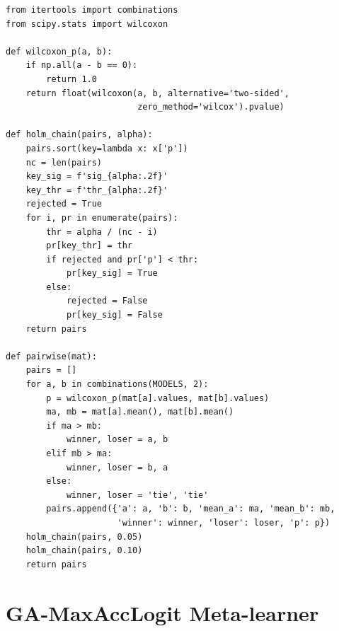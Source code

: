 \begin{lstlisting}
from itertools import combinations
from scipy.stats import wilcoxon

def wilcoxon_p(a, b):
    if np.all(a - b == 0):
        return 1.0
    return float(wilcoxon(a, b, alternative='two-sided',
                          zero_method='wilcox').pvalue)

def holm_chain(pairs, alpha):
    pairs.sort(key=lambda x: x['p'])
    nc = len(pairs)
    key_sig = f'sig_{alpha:.2f}'
    key_thr = f'thr_{alpha:.2f}'
    rejected = True
    for i, pr in enumerate(pairs):
        thr = alpha / (nc - i)
        pr[key_thr] = thr
        if rejected and pr['p'] < thr:
            pr[key_sig] = True
        else:
            rejected = False
            pr[key_sig] = False
    return pairs

def pairwise(mat):
    pairs = []
    for a, b in combinations(MODELS, 2):
        p = wilcoxon_p(mat[a].values, mat[b].values)
        ma, mb = mat[a].mean(), mat[b].mean()
        if ma > mb:
            winner, loser = a, b
        elif mb > ma:
            winner, loser = b, a
        else:
            winner, loser = 'tie', 'tie'
        pairs.append({'a': a, 'b': b, 'mean_a': ma, 'mean_b': mb,
                      'winner': winner, 'loser': loser, 'p': p})
    holm_chain(pairs, 0.05)
    holm_chain(pairs, 0.10)
    return pairs
\end{lstlisting}

\section{GA-MaxAccLogit Meta-learner}


